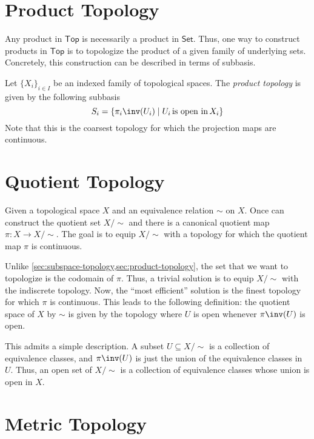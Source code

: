 \documentclass{amsart}
\begin{document}
\section{Product Topology}
\label{sec:product-topology}

Any product in $\mathsf{Top}$ is necessarily a product in $\mathsf{Set}$.
Thus, one way to construct products in $\mathsf{Top}$ is to topologize the product of a given family of underlying sets.
Concretely, this construction can be described in terms of subbasis.

\begin{defn}
  Let $\{X_{i}\}_{i \in I}$ be an indexed family of topological spaces.
  The \emph{product topology} is given by the following subbasis
  \[
    S_{i} = \{\pi_{i}\inv(U_{i}) \mid U_{i}\,\text{is open in}\,X_{i}\}
  \]
  Note that this is the coarsest topology for which the projection maps are continuous.
\end{defn}

\section{Quotient Topology}
\label{sec:quotient-topology}

Given a topological space $X$ and an equivalence relation $\sim$ on $X$.
Once can construct the quotient set $X/\sim$ and there is a canonical quotient map $\pi : X \to X/\sim$.
The goal is to equip $X/\sim$ with a topology for which the quotient map $\pi$ is continuous.

Unlike \cref{sec:subspace-topology,sec:product-topology}, the set that we want to topologize is the codomain of $\pi$.
Thus, a trivial solution is to equip $X/\sim$ with the indiscrete topology.
Now, the ``most efficient'' solution is the finest topology for which $\pi$ is continuous.
This leads to the following definition: the quotient space of $X$ by $\sim$ is given by the topology where $U$ is open whenever $\pi\inv(U)$ is open.

This admits a simple description.
A subset $U \subseteq X/\sim$ is a collection of equivalence classes, and $\pi\inv(U)$ is just the union of the equivalence classes in $U$.
Thus, an open set of $X/\sim$ is a collection of equivalence classes whose union is open in $X$.

\section{Metric Topology}
\label{sec:metric-topology}
\end{document}
